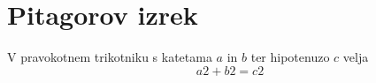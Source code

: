 \documentclass{article}
\begin{document}
 
\section*{Pitagorov izrek} 
V pravokotnem trikotniku s katetama \(a\) in \(b\) ter hipotenuzo \(c\) velja 
\[ a2 + b2 = c2 \] 
\end{document}
